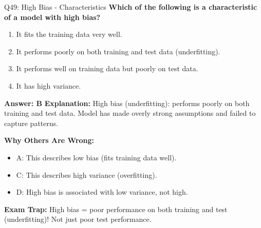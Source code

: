 \documentclass[8pt]{beamer}
\begin{document}
	\begin{frame}{Q49: High Bias - Characteristics}
		\fontsize{6.5}{7.5}\selectfont
		\textbf{Which of the following is a characteristic of a model with high bias?}
		
		\begin{enumerate}
			\item It fits the training data very well.
			\item It performs poorly on both training and test data (underfitting).
			\item It performs well on training data but poorly on test data.
			\item It has high variance.
		\end{enumerate}
		
		\vspace{0.05cm}
		\textcolor{myblue}{\textbf{Answer: B}}
		\vspace{0.05cm}
		\textcolor{myblue}{\textbf{Explanation:}} High bias (underfitting): performs poorly on both training and test data. Model has made overly strong assumptions and failed to capture patterns.
		
		\vspace{0.05cm}
		\textcolor{myred}{\textbf{Why Others Are Wrong:}}
		\begin{itemize}
			\item \textcolor{myred}{A:} This describes low bias (fits training data well).
			\item \textcolor{myred}{C:} This describes high variance (overfitting).
			\item \textcolor{myred}{D:} High bias is associated with low variance, not high.
		\end{itemize}
		
		\textcolor{myred}{\textbf{Exam Trap:}} High bias = \textcolor{myblue}{poor performance on both training and test} (underfitting)! Not just poor test performance.
	\end{frame}
	
\end{document}
